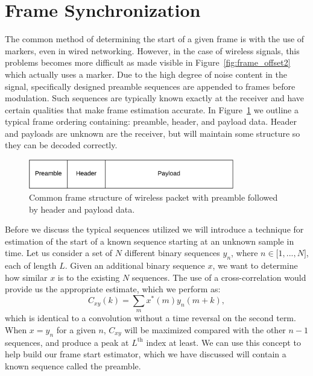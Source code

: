 \documentclass[letterpaper,12pt]{article}
\begin{document}
\section{Frame Synchronization}\label{sec:timing}
%
The common method of determining the start of a given frame is with the use of markers, even in wired 
networking.  However, in the case of wireless signals, this problems becomes more difficult as made visible 
in Figure~\ref{fig:frame_offset2} which actually uses a marker.  Due to the high degree of noise content in 
the signal, specifically designed preamble sequences are appended to frames before modulation.  Such 
sequences are typically known exactly at the receiver and have certain qualities that make frame estimation 
accurate.  In Figure~\ref{fig:frame_structure} we outline a typical frame ordering containing: preamble, 
header, and payload data.  Header and payloads are unknown are the receiver, but will maintain some structure 
so they can be decoded correctly.\par
%
\begin{figure}[ht!]\label{fig:frame_structure}
 \centering
 \includegraphics[width=0.8\textwidth]{Preamble-crop.pdf}
\caption{Common frame structure of wireless packet with preamble followed by header and payload data.}
\end{figure} 
%
Before we discuss the typical sequences utilized we will introduce a technique for estimation of the start of 
a known sequence starting at an unknown sample in time. Let us consider a set of $N$ different 
binary sequences $y_n$, where $n \in \big[1,...,N\big]$, each of length $L$.  Given an additional 
binary sequence $x$, we want to determine how similar $x$ is to the existing $N$ sequences.  The use of a 
cross-correlation would provide us the appropriate estimate, which we perform as:
%
\begin{equation}
  C_{xy}(k) = \sum_{m}x^{*}(m)y_n(m+k),
\end{equation}
%
which is identical to a convolution without a time reversal on the second term.  When $x=y_n$ for a given 
$n$, $C_{xy}$ will be maximized compared with the other $n-1$ sequences, and produce a peak at 
$L^{\mathrm{th}}$ index at least.  We can use this concept to help build our frame start estimator, which we 
have discussed will contain a known sequence called the preamble.\par
\end{document}
